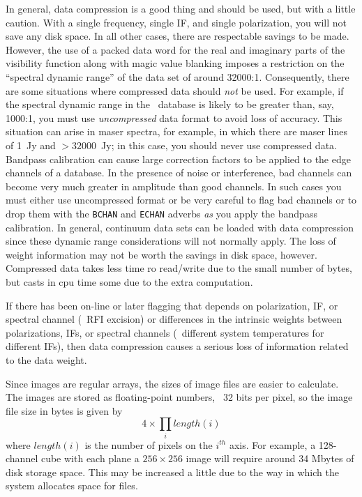      In general, data compression is a good thing and should be used,
but with a little caution.  With a single frequency, single IF, and
single polarization, you will not save any disk space.  In all other
cases, there are respectable savings to be made.  However, the use of
a packed data word for the real and imaginary parts of the visibility
function along with magic value blanking imposes a restriction on the
``spectral dynamic range'' of the data set of around 32000:1.
Consequently, there are some situations where compressed data should
{\it not} be used.  For example, if the spectral dynamic range in the
\uv\ database is likely to be greater than, say, 1000:1, you must use
{\it uncompressed} data format to avoid loss of accuracy.  This
situation can arise in maser spectra, for example, in which there are
maser lines of 1~Jy and $ >32000$~Jy; in this case, you should never
use compressed data.  Bandpass calibration can cause large correction
factors to be applied to the edge channels of a database.  In the
presence of noise or interference, bad channels can become very much
greater in amplitude than good channels.  In such cases you must
either use uncompressed format or be very careful to flag bad channels
or to drop them with the {\tt BCHAN} and {\tt ECHAN} adverbs {\it as}
you apply the bandpass calibration.  In general, continuum data sets
can be loaded with data compression since these dynamic range
considerations will not normally apply.  The
loss of weight information may not be worth the savings in disk space,
however.  Compressed data takes less time ro read/write due to the
small number of bytes, but casts in cpu time some due to the extra
computation.

If there has been on-line or later flagging that depends on
polarization, IF, or spectral channel (\ie\ RFI excision) or
differences in the intrinsic weights between polarizations, IFs, or
spectral channels (\ie\ different system temperatures for different
IFs), then data compression causes a serious loss of information
related to the data weight.



     Since images are regular arrays, the sizes of image files are
easier to calculate.  The images are stored as floating-point numbers,
\ie\ 32 bits per pixel, so the image file size in bytes is given by
$$
     4 \times \prod_{i} length(i)
$$
where $length(i)$ is the number of pixels on the $i^{th}$ axis.  For
example, a 128-channel cube with each plane a $256 \times 256$ image
will require around 34 Mbytes of disk storage space.  This may be
increased a little due to the way in which the system allocates space
for files.

